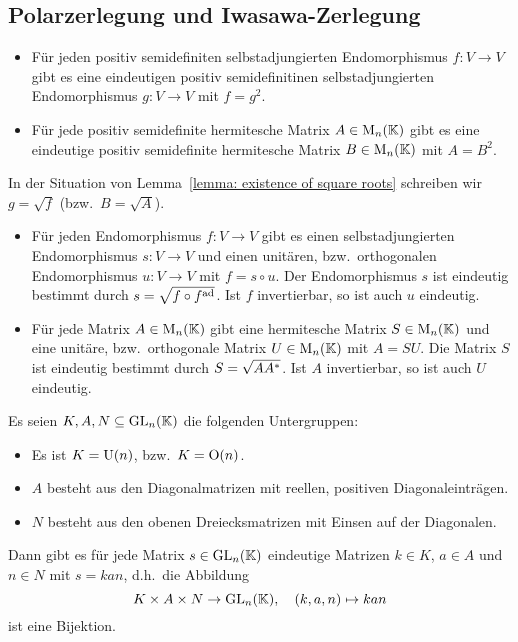 \subsection{Polarzerlegung und Iwasawa-Zerlegung}

\begin{lemma}
  \label{lemma: existence of square roots}
  \begin{itemize}
    \item
      Für jeden positiv semidefiniten selbstadjungierten Endomorphismus $f \colon V \to V$ gibt es eine eindeutigen positiv semidefinitinen selbstadjungierten Endomorphismus $g \colon V \to V$ mit $f = g^2$.
    \item
      Für jede positiv semidefinite hermitesche Matrix $A \in \operatorname{M}_{n}(\mathbb{K})$ gibt es eine eindeutige positiv semidefinite hermitesche Matrix $B \in \operatorname{M}_{n}(\mathbb{K})$ mit $A = B^2$.
  \end{itemize}
\end{lemma}

In der Situation von Lemma~\ref{lemma: existence of square roots} schreiben wir $g = \sqrt{f}$ (bzw.\ $B = \sqrt{A}$).

\begin{theorem}[Polarzerlegung]
  \begin{itemize}
    \item
      Für jeden Endomorphismus $f \colon V \to V$ gibt es einen selbstadjungierten Endomorphismus $s \colon V \to V$ und einen unitären, bzw.\ orthogonalen Endomorphismus $u \colon V \to V$ mit $f = s \circ u$.
      Der Endomorphismus $s$ ist eindeutig bestimmt durch $s = \sqrt{f \circ f^{\operatorname{ad}}}$.
      Ist $f$ invertierbar, so ist auch $u$ eindeutig.
    
    \item
      Für jede Matrix $A \in \operatorname{M}_{n}(\mathbb{K})$ gibt eine hermitesche Matrix $S \in \operatorname{M}_{n}(\mathbb{K})$ und eine unitäre, bzw.\ orthogonale Matrix $U \in \operatorname{M}_{n}(\mathbb{K})$ mit $A = SU$.
      Die Matrix $S$ ist eindeutig bestimmt durch $S = \sqrt{A A^*}$.
      Ist $A$ invertierbar, so ist auch $U$ eindeutig.
  \end{itemize}
\end{theorem}

\begin{theorem}
  Es seien $K, A, N \subseteq \operatorname{GL}_{n}(\mathbb{K})$ die folgenden Untergruppen:
  \begin{itemize}
    \item
      Es ist $K = \operatorname{U}(n)$, bzw.\ $K = \operatorname{O}(n)$.
    \item
      $A$ besteht aus den Diagonalmatrizen mit reellen, positiven Diagonaleinträgen.
    \item
      $N$ besteht aus den obenen Dreiecksmatrizen mit Einsen auf der Diagonalen.
  \end{itemize}
  Dann gibt es für jede Matrix $s \in \operatorname{GL}_{n}(\mathbb{K})$ eindeutige Matrizen $k \in K$, $a \in A$ und $n \in N$ mit $s = kan$, d.h.\ die Abbildung
  \[
            K \times A \times N
    \to     \operatorname{GL}_{n}(\mathbb{K}),
    \quad   (k, a, n)
    \mapsto kan
  \]
  ist eine Bijektion.
\end{theorem}

